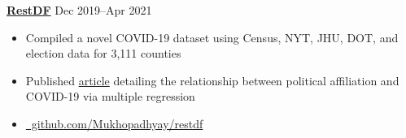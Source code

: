 \textbf{\href{https://github.com/petezh/COVID-Analysis}{RestDF}} \hfill Dec 2019--Apr 2021 \par
\begin{itemize}
	\item Compiled a novel COVID-19 dataset using Census, NYT, JHU, DOT, and election data for 3,111 counties
	\item Published \href{https://econreview.berkeley.edu/partisanship-and-covid-19-response/}{article} detailing the relationship between political affiliation and COVID-19 via multiple regression
\end{itemize}

\begin{itemize}
	\item[] \href{https://github.com/Mukhopadhyay/restdf}{\github\ github.com/Mukhopadhyay/restdf}
\end{itemize}

\vspace{0.1cm}\par